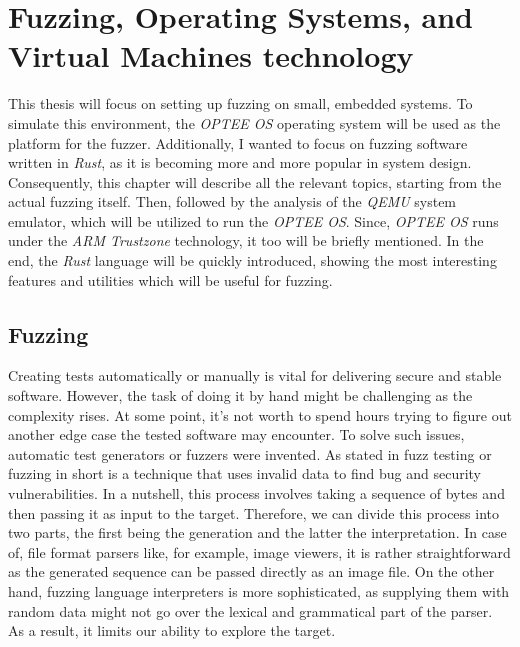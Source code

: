\cleardoublepage

\section{Fuzzing, Operating Systems, and Virtual Machines technology}

This thesis will focus on setting up fuzzing on small, embedded systems. To simulate this environment, the \textit{OPTEE OS} operating system will be used as the platform for the fuzzer. Additionally, I wanted to focus on fuzzing software written in \textit{Rust}, as it is becoming more and more popular in system design. Consequently, this chapter will describe all the relevant topics, starting from the actual fuzzing itself. Then, followed by the analysis of the \textit{QEMU} system emulator, which will be utilized to run the \textit{OPTEE OS}. Since, \textit{OPTEE OS} runs under the \textit{ARM Trustzone} technology, it too will be briefly mentioned. In the end, the \textit{Rust} language will be quickly introduced, showing the most interesting features and utilities which will be useful for fuzzing.

\subsection{Fuzzing} \label{chap:theory}

Creating tests automatically or manually is vital for delivering secure and stable software. However, the task of doing it by hand might be challenging as the complexity rises. At some point, it's not worth to spend hours trying to figure out another edge case the tested software may encounter. To solve such issues, automatic test generators or fuzzers were invented. As stated in \cite{fuzzing_state_of_art} fuzz testing or fuzzing in short is a technique that uses invalid data to find bug and security vulnerabilities. In a nutshell, this process involves taking a sequence of bytes and then passing it as input to the target. Therefore, we can divide this process into two parts, the first being the generation and the latter the interpretation. In case of, file format parsers like, for example, image viewers, it is rather straightforward as the generated sequence can be passed directly as an image file. On the other hand, fuzzing language interpreters is more sophisticated, as supplying them with random data might not go over the lexical and grammatical part of the parser. As a result, it limits our ability to explore the target.


